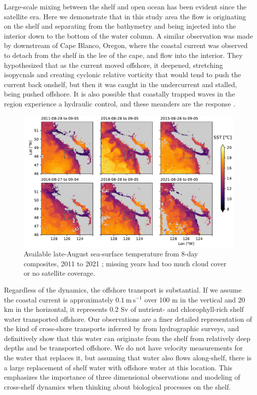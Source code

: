 \documentclass[draft]{agujournal2019}
\begin{document}
Large-scale mixing between the shelf and open ocean has been evident since the satellite era.  Here we demonstrate that in this study area the flow is originating on the shelf and separating from the bathymetry and being injected into the interior down to the bottom of the water column.  A  similar observation was made by  downstream of Cape Blanco, Oregon, where the coastal current was observed to detach from the shelf in the lee of the cape, and flow into the interior.  They hypothesized that as the current moved offshore, it deepened, stretching isopycnals and creating cyclonic relative vorticity that would tend to push the current back onshelf, but then it was caught in the undercurrent and stalled, being pushed offshore. It is also possible that coastally trapped waves in the region experience a hydraulic control, and these meanders are the response \cite{dalebarth01}.

\begin{figure}[htbp]
  \begin{center}
    \includegraphics[width=6in]{SSTLateAug}
    \caption{
      Available late-August sea-surface temperature from 8-day composites, 2011 to 2021 \cite{MODISSST8d}; missing years had too much cloud cover or no satellite coverage.  \label{fig:SSTLateAug} }
  \end{center}
\end{figure}

Regardless of the dynamics, the offshore transport is substantial.  If we assume the coastal current is approximately $0.1\ \mathrm{m\,s^{-1}}$ over 100 m in the vertical and 20 km in the horizontal, it represents 0.2 Sv of nutrient- and chlorophyll-rich shelf water transported offshore.  Our observations are a finer detailed representation of the kind of cross-shore transports inferred by  from hydrographic surveys, and definitively show that this water can originate from the shelf from relatively deep depths and be transported offshore.  We do not have velocity measurements for the water that replaces it, but assuming that water also flows along-shelf, there is a large replacement of shelf water with offshore water at this location.  This emphasizes the importance of three dimensional observations and modeling of cross-shelf dynamics when thinking about biological processes on the shelf.
\end{document}
